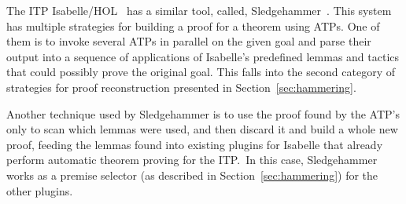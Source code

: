 The ITP Isabelle/HOL~\cite{Nipkow2002} has a similar tool,
called, Sledgehammer~\cite{sledgehammer}. This system has multiple
strategies for building a proof for a theorem using ATPs. One of them
is to invoke several ATPs in parallel on the given goal
and parse their output into a sequence of applications of Isabelle's
predefined lemmas and tactics that could possibly prove the original
goal. This falls into the second category of strategies for proof
reconstruction presented in Section~\ref{sec:hammering}.

Another technique used by Sledgehammer is to use the proof found
by the ATP's only to scan which lemmas were used, and then discard
it and build a whole new proof, feeding the lemmas found into existing
plugins for Isabelle that already perform automatic theorem proving for
the ITP.\ In this case, Sledgehammer works as a premise selector
(as described in Section~\ref{sec:hammering}) for the other plugins.
